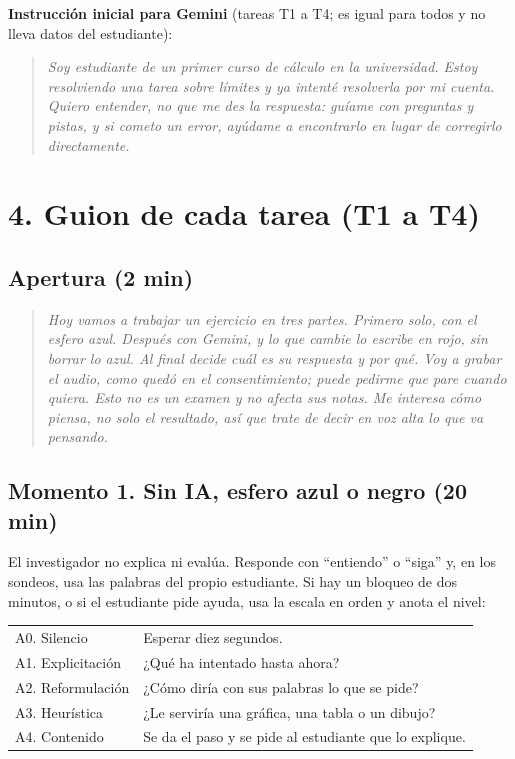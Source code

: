 \documentclass[11pt,letterpaper]{article}
\newenvironment{guion}{\begin{quote}\itshape}{\end{quote}}
\begin{document}
\textbf{Instrucción inicial para Gemini} (tareas T1 a T4; es igual para todos y no lleva datos del estudiante):
\begin{guion}
Soy estudiante de un primer curso de cálculo en la universidad. Estoy resolviendo una tarea sobre límites y ya intenté resolverla por mi cuenta. Quiero entender, no que me des la respuesta: guíame con preguntas y pistas, y si cometo un error, ayúdame a encontrarlo en lugar de corregirlo directamente.
\end{guion}

\section*{4. Guion de cada tarea (T1 a T4)}

\subsection*{Apertura (2 min)}
\begin{guion}
Hoy vamos a trabajar un ejercicio en tres partes. Primero solo, con el esfero azul. Después con Gemini, y lo que cambie lo escribe en rojo, sin borrar lo azul. Al final decide cuál es su respuesta y por qué. Voy a grabar el audio, como quedó en el consentimiento; puede pedirme que pare cuando quiera. Esto no es un examen y no afecta sus notas. Me interesa cómo piensa, no solo el resultado, así que trate de decir en voz alta lo que va pensando.
\end{guion}

\subsection*{Momento 1. Sin IA, esfero azul o negro (20 min)}

El investigador no explica ni evalúa. Responde con ``entiendo'' o ``siga'' y, en los sondeos, usa las palabras del propio estudiante. Si hay un bloqueo de dos minutos, o si el estudiante pide ayuda, usa la escala en orden y anota el nivel:

\begin{center}\small
\begin{tabularx}{\linewidth}{@{}p{3.6cm}L@{}}
\toprule
A0. Silencio & Esperar diez segundos. \\
A1. Explicitación & ¿Qué ha intentado hasta ahora? \\
A2. Reformulación & ¿Cómo diría con sus palabras lo que se pide? \\
A3. Heurística & ¿Le serviría una gráfica, una tabla o un dibujo? \\
A4. Contenido & Se da el paso y se pide al estudiante que lo explique. \\
\bottomrule
\end{tabularx}
\end{center}
\end{document}
